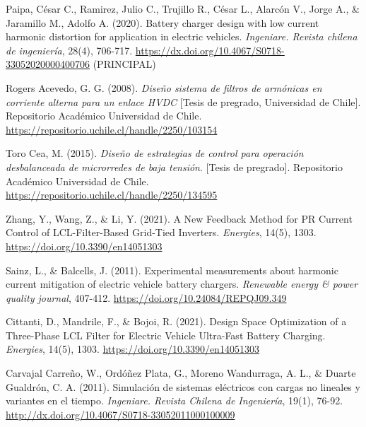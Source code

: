 \begin{thebibliography}{9}
    Paipa, César C., Ramirez, Julio C., Trujillo R., César L., Alarcón V., Jorge A., \& Jaramillo M., Adolfo A. (2020). Battery charger design with low current harmonic distortion for application in electric vehicles. \textit{Ingeniare. Revista chilena de ingeniería}, 28(4), 706-717. \url{https://dx.doi.org/10.4067/S0718-33052020000400706} (PRINCIPAL)

    Rogers Acevedo, G. G. (2008). \textit{Diseño sistema de filtros de armónicas en corriente alterna para un enlace HVDC} [Tesis de pregrado, Universidad de Chile]. Repositorio Académico Universidad de Chile. \url{https://repositorio.uchile.cl/handle/2250/103154}

    Toro Cea, M. (2015). \textit{Diseño de estrategias de control para operación desbalanceada de microrredes de baja tensión}. [Tesis de pregrado]. Repositorio Académico Universidad de Chile. \url{https://repositorio.uchile.cl/handle/2250/134595}

    Zhang, Y., Wang, Z., \& Li, Y. (2021). A New Feedback Method for PR Current Control of LCL-Filter-Based Grid-Tied Inverters. \textit{Energies}, 14(5), 1303. \url{https://doi.org/10.3390/en14051303}

    Sainz, L., \& Balcells, J. (2011). Experimental measurements about harmonic current mitigation of electric vehicle battery chargers. \textit{Renewable energy \& power quality journal}, 407-412. \url{https://doi.org/10.24084/REPQJ09.349}

    Cittanti, D., Mandrile, F., \& Bojoi, R. (2021). Design Space Optimization of a Three-Phase LCL Filter for Electric Vehicle Ultra-Fast Battery Charging. \textit{Energies}, 14(5), 1303. \url{https://doi.org/10.3390/en14051303}

    Carvajal Carreño, W., Ordóñez Plata, G., Moreno Wandurraga, A. L., \& Duarte Gualdrón, C. A. (2011). Simulación de sistemas eléctricos con cargas no lineales y variantes en el tiempo. \textit{Ingeniare. Revista Chilena de Ingeniería}, 19(1), 76-92. \url{http://dx.doi.org/10.4067/S0718-33052011000100009}

\end{thebibliography}
